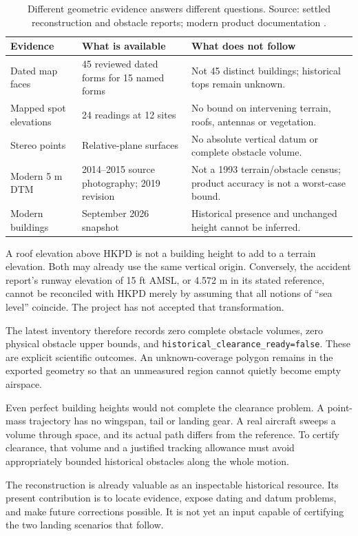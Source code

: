 \begin{table}[H]\small
\caption{Different geometric evidence answers different questions. Source: settled reconstruction and obstacle reports; modern product documentation \cite{dtm,buildings}.}
\begin{tabularx}{\textwidth}{@{}p{}p{}X@{}}\toprule
Evidence & What is available & What does not follow\\\midrule
Dated map faces & 45 reviewed dated forms for 15 named forms & Not 45 distinct buildings; historical tops remain unknown.\\
Mapped spot elevations & 24 readings at 12 sites & No bound on intervening terrain, roofs, antennas or vegetation.\\
Stereo points & Relative-plane surfaces & No absolute vertical datum or complete obstacle volume.\\
Modern 5 m DTM & 2014--2015 source photography; 2019 revision & Not a 1993 terrain/obstacle census; product accuracy is not a worst-case bound.\\
Modern buildings & September 2026 snapshot & Historical presence and unchanged height cannot be inferred.\\\bottomrule
\end{tabularx}\end{table}

A roof elevation above HKPD is not a building height to add to a terrain elevation. Both may already use the same vertical origin. Conversely, the accident report's runway elevation of 15 ft AMSL, or 4.572 m in its stated reference, cannot be reconciled with HKPD merely by assuming that all notions of ``sea level'' coincide. The project has not accepted that transformation.

The latest inventory therefore records zero complete obstacle volumes, zero physical obstacle upper bounds, and \texttt{historical\_clearance\_ready=false}. These are explicit scientific outcomes. An unknown-coverage polygon remains in the exported geometry so that an unmeasured region cannot quietly become empty airspace.

Even perfect building heights would not complete the clearance problem. A point-mass trajectory has no wingspan, tail or landing gear. A real aircraft sweeps a volume through space, and its actual path differs from the reference. To certify clearance, that volume and a justified tracking allowance must avoid appropriately bounded historical obstacles along the whole motion.

The reconstruction is already valuable as an inspectable historical resource. Its present contribution is to locate evidence, expose dating and datum problems, and make future corrections possible. It is not yet an input capable of certifying the two landing scenarios that follow.
\clearpage
